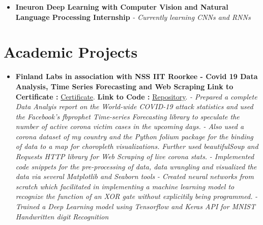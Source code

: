 \documentclass[a4paper,12pt]{article}
\begin{document}
\begin{itemize}
    \item{\textbf{\large{Ineuron Deep Learning with Computer Vision and Natural Language Processing Internship}}
    \newline
    \textit{- Currently learning CNNs and RNNs }}
\end{itemize}


\section*{Academic Projects}
\begin{itemize}
    \item{\textbf{\large{Finland Labs in association with NSS IIT Roorkee - Covid 19 Data Analysis, Time Series Forecasting and Web Scraping}}
    \newline
    \textbf{Link to Certificate :} \href{https://github.com/teetangh/Kaustav-All-Certifications/blob/master/Artificial%20Intelligence/Finland%20Labs%20and%20IITR/Covid%2019%20Analysis%20-%20AI%20and%20ML.pdf}{Certificate}.
    \textbf{ Link to Code :} \href{https://github.com/teetangh/FinlandLabs-IITR-COVID-19-Analysis}{Repository}.
    \newline
    \textit{- Prepared a complete Data Analyis report on the World-wide COVID-19 attack statistics and used the Facebook's fbprophet Time-series Forecasting library to speculate the number of active corona victim cases in the upcoming days.} 
    \newline
    \textit{- Also used a corona dataset of my country and the Python folium package for the binding of data to a map for choropleth visualizations. Further used beautifulSoup and Requests HTTP library for Web Scraping of live corona stats.}
    \newline
    \textit{- Implemented code snippets for the pre-processing of data, data wrangling and visualized the data via several Matplotlib and Seaborn tools }
    \newline
    \textit{- Created neural networks from scratch which facilitated in implementing a machine learning model to recognize the function of an XOR gate without explicitily being programmed.}
    \newline
    \textit{- Trained a Deep Learning model using Tensorflow and Keras API for MNIST Handwritten digit Recognition}}


\end{itemize}
\end{document}
